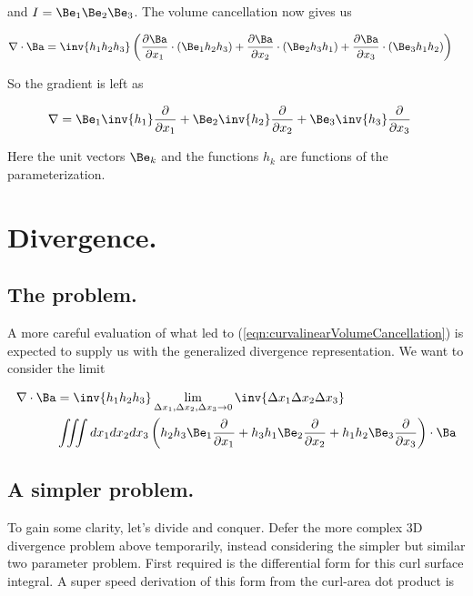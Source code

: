 and $I = \Be_1 \Be_2 \Be_3$.  The volume cancellation now gives us

\begin{align}\label{eqn:curvalinearVolumeCancellation}
\grad \cdot \Ba &=
\inv{h_1 h_2 h_3} \left(
  \PD{x_1}{\Ba} \cdot (\Be_1 h_2 h_3 )
+ \PD{x_2}{\Ba} \cdot (\Be_2 h_3 h_1 )
+ \PD{x_3}{\Ba} \cdot (\Be_3 h_1 h_2 )  \right)
\end{align}

So the gradient is left as

\begin{align}\label{eqn:gradientCurva}
\grad &=
 \Be_1 \inv{h_1} \PD{x_1}{}
+\Be_2 \inv{h_2} \PD{x_2}{}
+\Be_3 \inv{h_3} \PD{x_3}{}
\end{align}

Here the unit vectors $\Be_k$ and the functions $h_k$ are functions of the parameterization.

\section{Divergence.}

\subsection{The problem.}

A more careful evaluation of what led to (\ref{eqn:curvalinearVolumeCancellation}) is expected to supply us with the generalized divergence representation.  We want to consider the limit

\begin{align*}
\grad \cdot \Ba &= 
\inv{h_1 h_2 h_3}
\lim_{
\Delta x_1, \Delta x_2, \Delta x_3 \rightarrow 0}
\inv{\Delta x_1 \Delta x_2 \Delta x_3
} \\
&\iiint dx_1 dx_2 dx_3 \left(
h_2 h_3 \Be_1 \PD{x_1}{}
+h_3 h_1 \Be_2 \PD{x_2}{}
+h_1 h_2 \Be_3 \PD{x_3}{} \right) \cdot \Ba
\end{align*}

\subsection{A simpler problem.}

To gain some clarity, let's divide and conquer.  Defer the more complex 3D divergence problem above temporarily, instead considering the simpler but similar two parameter problem.  First required is the differential form for this curl surface integral.  A super speed derivation of this form from the curl-area dot product is

